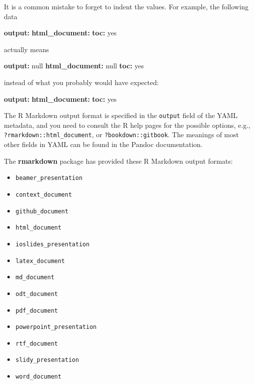 \documentclass[
  12pt,
]{krantz}
\newenvironment{Shaded}{\begin{snugshade}}{\end{snugshade}}
\newcommand{\AttributeTok}[1]{\textcolor[rgb]{0.13,0.29,0.53}{#1}}
\newcommand{\CharTok}[1]{\textcolor[rgb]{0.31,0.60,0.02}{#1}}
\newcommand{\FunctionTok}[1]{\textcolor[rgb]{0.13,0.29,0.53}{\textbf{#1}}}
\newcommand{\KeywordTok}[1]{\textcolor[rgb]{0.13,0.29,0.53}{\textbf{#1}}}
\providecommand{\tightlist}{%
  \setlength{\itemsep}{0pt}\setlength{\parskip}{0pt}}
\theoremstyle{definition}
\theoremstyle{definition}
\theoremstyle{definition}
\theoremstyle{definition}
\theoremstyle{remark}
\begin{document}
It is a common mistake to forget to indent the values. For example, the following data

\begin{Shaded}
\begin{Highlighting}[]
\FunctionTok{output}\KeywordTok{:}
\FunctionTok{html\_document}\KeywordTok{:}
\FunctionTok{toc}\KeywordTok{:}\AttributeTok{ }\CharTok{yes}
\end{Highlighting}
\end{Shaded}

actually means

\begin{Shaded}
\begin{Highlighting}[]
\FunctionTok{output}\KeywordTok{:}\AttributeTok{ }\CharTok{null}
\FunctionTok{html\_document}\KeywordTok{:}\AttributeTok{ }\CharTok{null}
\FunctionTok{toc}\KeywordTok{:}\AttributeTok{ }\CharTok{yes}
\end{Highlighting}
\end{Shaded}

instead of what you probably would have expected:

\begin{Shaded}
\begin{Highlighting}[]
\FunctionTok{output}\KeywordTok{:}
\AttributeTok{  }\FunctionTok{html\_document}\KeywordTok{:}
\AttributeTok{    }\FunctionTok{toc}\KeywordTok{:}\AttributeTok{ }\CharTok{yes}
\end{Highlighting}
\end{Shaded}

The R Markdown output format is specified in the \texttt{output} field of the YAML metadata, and you need to consult the R help pages for the possible options, e.g., \texttt{?rmarkdown::html\_document}, or \texttt{?bookdown::gitbook}. The meanings of most other fields in YAML can be found in the Pandoc documentation.

The \textbf{rmarkdown} package has provided these R Markdown output formats:

\begin{itemize}
\tightlist
\item
  \texttt{beamer\_presentation}
\item
  \texttt{context\_document}
\item
  \texttt{github\_document}
\item
  \texttt{html\_document}
\item
  \texttt{ioslides\_presentation}
\item
  \texttt{latex\_document}
\item
  \texttt{md\_document}
\item
  \texttt{odt\_document}
\item
  \texttt{pdf\_document}
\item
  \texttt{powerpoint\_presentation}
\item
  \texttt{rtf\_document}
\item
  \texttt{slidy\_presentation}
\item
  \texttt{word\_document}
\end{itemize}
\end{document}
